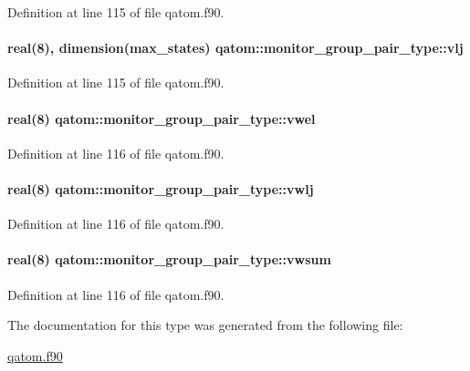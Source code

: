 Definition at line 115 of file qatom.\-f90.

\hypertarget{structqatom_1_1monitor__group__pair__type_a3532172c6c4866e68abb516e4b9e0329}{
\paragraph[{vlj}]{\setlength{\rightskip}{0pt plus 5cm}real(8), dimension({\bf max\-\_\-states}) qatom\-::monitor\-\_\-group\-\_\-pair\-\_\-type\-::vlj}}\label{structqatom_1_1monitor__group__pair__type_a3532172c6c4866e68abb516e4b9e0329}


Definition at line 115 of file qatom.\-f90.

\hypertarget{structqatom_1_1monitor__group__pair__type_ab512a5f5e7c8015b25738d21f137c22f}{
\paragraph[{vwel}]{\setlength{\rightskip}{0pt plus 5cm}real(8) qatom\-::monitor\-\_\-group\-\_\-pair\-\_\-type\-::vwel}}\label{structqatom_1_1monitor__group__pair__type_ab512a5f5e7c8015b25738d21f137c22f}


Definition at line 116 of file qatom.\-f90.

\hypertarget{structqatom_1_1monitor__group__pair__type_aad20fd34531692f1b03ab7aa40e5edc4}{
\paragraph[{vwlj}]{\setlength{\rightskip}{0pt plus 5cm}real(8) qatom\-::monitor\-\_\-group\-\_\-pair\-\_\-type\-::vwlj}}\label{structqatom_1_1monitor__group__pair__type_aad20fd34531692f1b03ab7aa40e5edc4}


Definition at line 116 of file qatom.\-f90.

\hypertarget{structqatom_1_1monitor__group__pair__type_a1e9047683fbeef69a80167891938fd0a}{
\paragraph[{vwsum}]{\setlength{\rightskip}{0pt plus 5cm}real(8) qatom\-::monitor\-\_\-group\-\_\-pair\-\_\-type\-::vwsum}}\label{structqatom_1_1monitor__group__pair__type_a1e9047683fbeef69a80167891938fd0a}


Definition at line 116 of file qatom.\-f90.



The documentation for this type was generated from the following file\-:\begin{DoxyCompactItemize}
\item 
\hyperlink{qatom_8f90}{qatom.\-f90}\end{DoxyCompactItemize}
